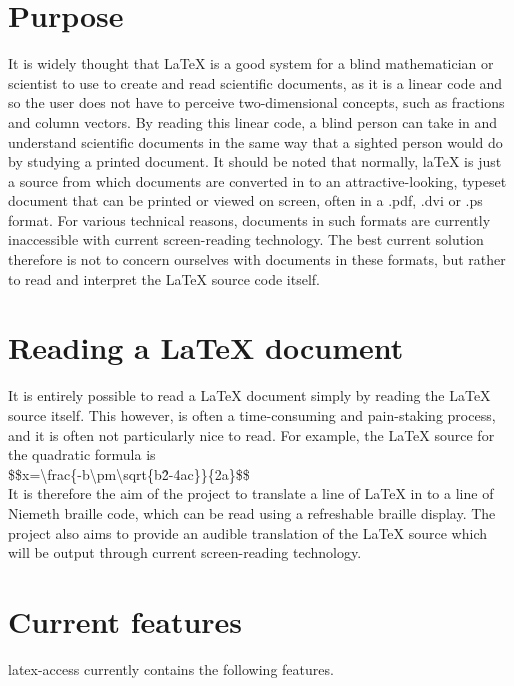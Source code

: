 \documentclass[12pt,a4paper]{report}
\begin{document}
\section{Purpose}
\label{subchap-purpose}
It is widely thought that LaTeX is a good system for a blind
mathematician or scientist to use to create and read
scientific documents, as it is a linear code and so the user does
not have to perceive two-dimensional concepts, such
as fractions and column vectors.
By reading this linear code, a blind person can take in and
understand scientific documents in the same way that a
sighted person would do by studying a printed document.
It should be noted that normally, laTeX is just a source from which
documents are converted in to an
attractive-looking, typeset document that can be printed or viewed
on screen, often in a .pdf, .dvi or .ps format. For
various technical reasons, documents in such formats are
currently inaccessible with current screen-reading technology.
The best current solution therefore is not to concern
ourselves with documents in these formats, but rather to
read
and interpret the LaTeX source code itself.

\section{Reading a LaTeX document}
\label{subchap-reading-latex-document}

It is entirely possible to read a LaTeX document simply by reading
the LaTeX source itself. This however, is often a
time-consuming and pain-staking process, and it is often not
particularly nice to read. For example, the LaTeX source
for the quadratic formula is\\
\mbox{\$\$x=\textbackslash frac\{-b\textbackslash pm\textbackslash sqrt\{b\^2-4ac\}\}\{2a\}\$\$}\\
It is therefore the aim of the project to translate a
line of LaTeX in to a line of Niemeth braille code, which
can be
read using a refreshable braille display. The project
also aims to provide an audible translation of the
LaTeX source
which will be output through current screen-reading
technology.          

\section{Current features}
\label{subchap-current-features}


latex-access currently contains the following features.
\end{document}
